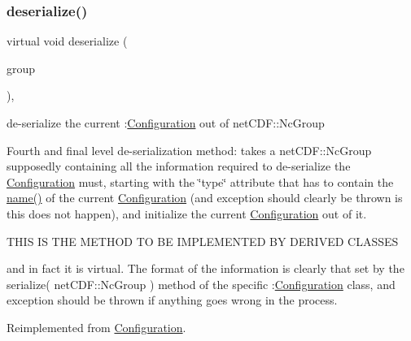 \subsubsection{\texorpdfstring{deserialize()}{deserialize()}\hspace{0.1cm}{\footnotesize\ttfamily [2/2]}}
{\footnotesize\ttfamily virtual void deserialize (\begin{DoxyParamCaption}\item[{net\+C\+D\+F\+::\+Nc\+Group \&\&}]{group }\end{DoxyParamCaption})\hspace{0.3cm}{\ttfamily [override]}, {\ttfamily [virtual]}}



de-\/serialize the current \+:\mbox{\hyperlink{class_s_m_spp__di__unipi__it_1_1_configuration}{Configuration}} out of net\+C\+D\+F\+::\+Nc\+Group 

Fourth and final level de-\/serialization method\+: takes a net\+C\+D\+F\+::\+Nc\+Group supposedly containing all the information required to de-\/serialize the \mbox{\hyperlink{class_s_m_spp__di__unipi__it_1_1_configuration}{Configuration}} must, starting with the \char`\"{}type\char`\"{} attribute that has to contain the \mbox{\hyperlink{class_s_m_spp__di__unipi__it_1_1_configuration_a738e9dfd6e00507da219e4bd5a3f6be9}{name()}} of the current \mbox{\hyperlink{class_s_m_spp__di__unipi__it_1_1_configuration}{Configuration}} (and exception should clearly be thrown is this does not happen), and initialize the current \mbox{\hyperlink{class_s_m_spp__di__unipi__it_1_1_configuration}{Configuration}} out of it. \begin{DoxyVerb} THIS IS THE METHOD TO BE IMPLEMENTED BY DERIVED CLASSES
\end{DoxyVerb}


and in fact it is virtual. The format of the information is clearly that set by the serialize( net\+C\+D\+F\+::\+Nc\+Group ) method of the specific \+:\mbox{\hyperlink{class_s_m_spp__di__unipi__it_1_1_configuration}{Configuration}} class, and exception should be thrown if anything goes wrong in the process. 

Reimplemented from \mbox{\hyperlink{class_s_m_spp__di__unipi__it_1_1_configuration_af03cd244e01fc59411ed4fcd6bd92949}{Configuration}}.

\mbox{\label{class_s_m_spp__di__unipi__it_1_1_block_config_a019850055afe817b816bae5699f461d3}} 
